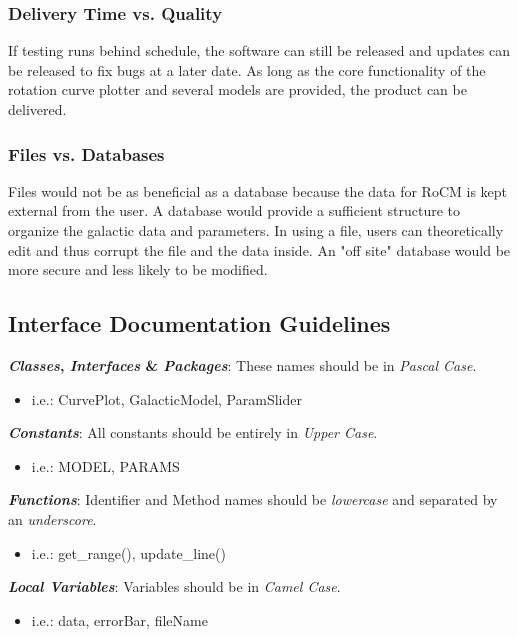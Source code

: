 \documentclass[titlepage]{article}
\begin{document}
\subsubsection{Delivery Time vs. Quality}
If testing runs behind schedule, the software can still be released and updates can be released to fix bugs at a later date. As long as the core functionality of the rotation curve plotter and several models are provided, the product can be delivered.

\subsubsection{Files vs. Databases}
Files would not be as beneficial as a database because the data for RoCM is kept external from the user. A database would provide a sufficient structure to organize the galactic data and parameters. In using a file, users can theoretically edit and thus corrupt the file and the data inside. An "off site" database would be more secure and less likely to be modified.

\subsection{Interface Documentation Guidelines}
\textbf{\textit{Classes}, \textit{Interfaces} \& \textit{Packages}}: These names should be in \textit{Pascal Case}.
\begin{itemize}
	\item i.e.: CurvePlot, GalacticModel, ParamSlider
\end{itemize}
\textbf{\textit{Constants}}: All constants should be entirely in \textit{Upper Case}.
\begin{itemize}
	\item i.e.: MODEL, PARAMS 
\end{itemize}
\textbf{\textit{Functions}}: Identifier and Method names should be \textit{lowercase} and separated by an \textit{underscore}.
\begin{itemize}
	\item i.e.: get\_range(), update\_line()
\end{itemize}
\textbf{\textit{Local Variables}}: Variables should be in \textit{Camel Case}.
\begin{itemize}
	\item i.e.: data, errorBar, fileName
\end{itemize}
\end{document}
